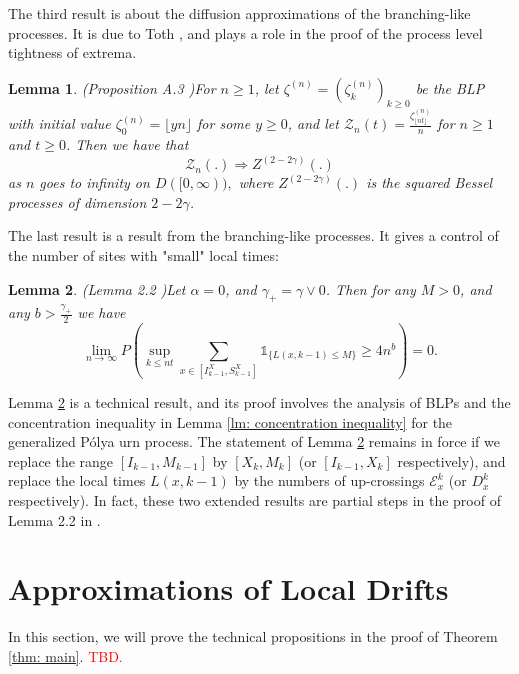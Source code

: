 \documentclass[twoside,12pt,a4paper]{article}
\newtheorem{lemma}{Lemma}[section]
\numberwithin{equation}{section}
\newcommand\TBD{\textcolor{red}{TBD.}}
\begin{document}
{		The third result is about the diffusion approximations of the branching-like processes. It is due to Toth \cite{T96}, and plays a role in the proof of the process level tightness of extrema. 
		
		\begin{lemma}(Proposition A.3 \cite{KMP22})\label{lm: diffusion approximation of blp}
			For $n\geq 1$, let $\zeta^{(n)}=(\zeta^{(n)}_k)_{k\geq 0 }  $ be the BLP with initial value $\zeta^{(n)}_0 = \lfloor yn \rfloor$ for some $y \geq 0$, and let $\mathcal{Z}_n(t) = \frac{\zeta^{(n)}_{\lfloor nt \rfloor}}{n}$ for $n\geq 1$ and $t\geq 0$. Then we have that 
			$$
			\mathcal{Z}_n(.) \Longrightarrow Z^{(2-2\gamma)}(.)
			$$ as $n$ goes to infinity on $D([0,\infty)),$ where $Z^{(2-2\gamma)}(.)$ is the squared Bessel processes of dimension $2-2\gamma$.
		\end{lemma}
		
		The last result is a result from the branching-like processes. It gives a control of the number of sites with "small" local times:
		\begin{lemma}(Lemma 2.2 \cite{KMP22})\label{lm: number of rarely visit sites}
			Let $\alpha =0$, and $\gamma_+ = \gamma \vee 0$. Then for any $M>0$, and any $b>\frac{\gamma_+}{2}$ we have
			$$
			\lim_{n\to\infty} P\left(\sup_{k\leq nt}  \sum_{x\in [I^X_{k-1}, S^X_{k-1}]} \mathbb{1}_{\{ L(x,k-1) \leq M \}} \geq 4n^b \right) = 0.
			$$
			
		\end{lemma}	
		Lemma \ref{lm: number of rarely visit sites} is a technical result, and its proof involves the analysis of BLPs and the concentration inequality in Lemma \ref{lm: concentration inequality} for the generalized P\'{o}lya urn process. The statement of Lemma \ref{lm: number of rarely visit sites} remains in force if we replace the range $[I_{k-1}, M_{k-1}]$ by $[X_k,M_k]$ (or $[I_{k-1},X_k]$ respectively), and replace the local times $L(x,k-1)$ by the numbers of up-crossings $\mathcal{E}^{k}_x$ (or $D^{k}_x$ respectively). In fact, these two extended results are partial steps in the proof of Lemma 2.2 in \cite{KMP22}.   
		
		
		\section{Approximations of Local Drifts}\label{sec: approximations}
		In this section, we will prove the technical propositions in the proof of Theorem \ref{thm: main}. \TBD
		
		
}
\end{document}
